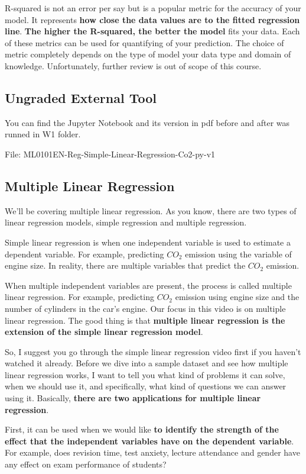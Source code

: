 	R-squared is not an error per say but is a popular metric for the accuracy of your model. It represents \textbf{how close the data values are to the fitted regression line}. \textbf{The higher the R-squared, the better the model} fits your data. Each of these metrics can be used for quantifying of your prediction. The choice of metric completely depends on the type of model your data type and domain of knowledge. Unfortunately, further review is out of scope of this course.
	
	\subsection{Ungraded External Tool}
	You can find the Jupyter Notebook and its version in pdf before and after was runned in W1 folder.
	
	File: ML0101EN-Reg-Simple-Linear-Regression-Co2-py-v1
	
	\subsection{Multiple Linear Regression}
	We'll be covering multiple linear regression. As you know, there are two types of linear regression models, simple regression and multiple regression. 
	
	Simple linear regression is when one independent variable is used to estimate a dependent variable. For example, predicting $CO_2$ emission using the variable of engine size. In reality, there are multiple variables that predict the $CO_2$ emission. 
	
	When multiple independent variables are present, the process is called multiple linear regression. For example, predicting $CO_2$ emission using engine size and the number of cylinders in the car's engine. Our focus in this video is on multiple linear regression. The good thing is that \textbf{multiple linear regression is the extension of the simple linear regression model}. 
	
	So, I suggest you go through the simple linear regression video first if you haven't watched it already. Before we dive into a sample dataset and see how multiple linear regression works, I want to tell you what kind of problems it can solve, when we should use it, and specifically, what kind of questions we can answer using it. Basically, \textbf{there are two applications for multiple linear regression}. 
	
	First, it can be used when we would like \textbf{to identify the strength of the effect that the independent variables have on the dependent variable}. For example, does revision time, test anxiety, lecture attendance and gender have any effect on exam performance of students? 
	
